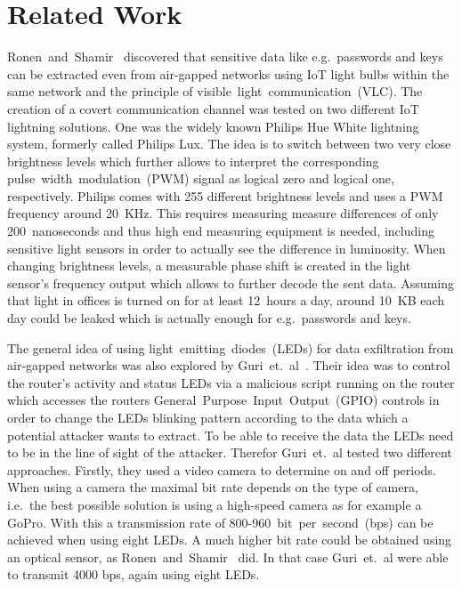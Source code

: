 \section{Related Work} %
\label{sec:related_work}


Ronen~and~Shamir~\cite{Ronen:2016:EFAIDCSL} discovered that sensitive data like e.g.\ passwords and keys can be extracted even from air-gapped networks using IoT light bulbs within the same network and the principle of visible~light~communication~(VLC). The creation of a covert communication channel was tested on two different IoT lightning solutions. One was the widely known Philips Hue White lightning system, formerly called Philips Lux. 
The idea is to switch between two very close brightness levels which further allows to interpret the corresponding pulse~width~modulation~(PWM) signal as logical zero and logical one, respectively. Philips comes with 255 different brightness levels and uses a PWM frequency around 20~KHz.
This requires measuring measure differences of only 200~nanoseconds and thus high end measuring equipment is needed, including sensitive light sensors in order to actually see the difference in luminosity.
When changing brightness levels, a measurable phase shift is created in the light sensor's frequency output which allows to further decode the sent data.
Assuming that light in offices is turned on for at least 12~hours a day, around 10~KB each day could be leaked which is actually enough for e.g.\ passwords and keys.

The general idea of using light~emitting~diodes~(LEDs) for data exfiltration from air-gapped networks was also explored by Guri~et.~al~\cite{Guri:2017:xCDEANvRL}. Their idea was to control the router's activity and status LEDs via a malicious script running on the router which accesses the routers General~Purpose~Input~Output~(GPIO) controls in order to change the LEDs blinking pattern according to the data which a potential attacker wants to extract.
To be able to receive the data the LEDs need to be in the line of sight of the attacker. Therefor Guri~et.~al tested two different approaches. Firstly, they used a video camera to determine on and off periods. When using a camera the maximal bit rate depends on the type of camera, i.e.\ the best possible solution is using a high-speed camera as for example a GoPro. With this a transmission rate of 800-960~bit~per~second~(bps) can be achieved when using eight LEDs. A much higher bit rate could be obtained using an optical sensor, as Ronen~and~Shamir~\cite{Ronen:2016:EFAIDCSL} did. In that case Guri~et.~al were able to transmit 4000 bps, again using eight LEDs.

